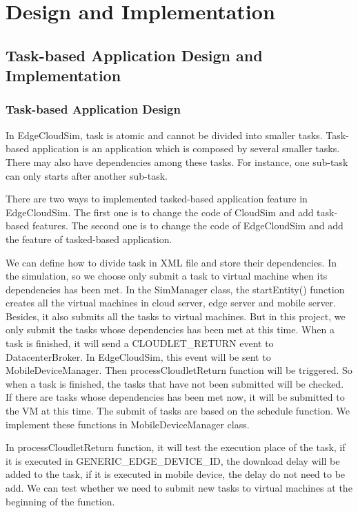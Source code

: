 \section{Design and Implementation}

\subsection{Task-based Application Design and Implementation}

\subsubsection{Task-based Application Design}
In EdgeCloudSim, task is atomic and cannot be divided into smaller tasks. Task-based application is an application which is composed by several smaller tasks. There may also have dependencies among these tasks. For instance, one sub-task can only starts after another sub-task. 

There are two ways to implemented tasked-based application feature in EdgeCloudSim. The first one is to change the code of CloudSim and add task-based features. The second one is to change the code of EdgeCloudSim and add the feature of tasked-based application.

We can define how to divide task in XML file and store their dependencies. In the simulation, so we choose only submit a task to virtual machine when its dependencies has been met. In the SimManager class, the startEntity() function creates all the virtual machines in cloud server, edge server and mobile server. Besides, it also submits all the tasks to virtual machines. But in this project, we only submit the tasks whose dependencies has been met at this time. When a task is finished, it will send a CLOUDLET\_RETURN event to DatacenterBroker. In EdgeCloudSim, this event will be sent to MobileDeviceManager. Then processCloudletReturn function will be triggered. So when a task is finished, the tasks that have not been submitted will be checked. If there are tasks whose dependencies has been met now, it will be submitted to the VM at this time. The submit of tasks are based on the schedule function. We implement these functions in MobileDeviceManager class.

In processCloudletReturn function, it will test the execution place of the task, if it is executed in GENERIC\_EDGE\_DEVICE\_ID, the download delay will be added to the task, if it is executed in mobile device, the delay do not need to be add. We can test whether we need to submit new tasks to virtual machines at the  beginning of the function. 


